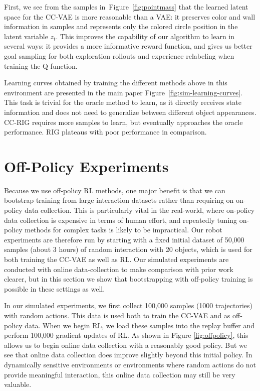 First, we see from the samples in~Figure~\ref{fig:pointmass} that the learned latent space for the CC-VAE is more reasonable than a VAE: it preserves color and wall information in samples and represents only the colored circle position in the latent variable $z_t$. This improves the capability of our algorithm to learn in several ways: it provides a more informative reward function, and gives us better goal sampling for both exploration rollouts and experience relabeling when training the Q function.

Learning curves obtained by training the different methods above in this environment are presented in the main paper Figure~\ref{fig:sim-learning-curves}. This task is trivial for the oracle method to learn, as it directly receives state information and does not need to generalize between different object appearances. CC-RIG requires more samples to learn, but eventually approaches the oracle performance. RIG plateaus with poor performance in comparison.

\pagebreak

\section{Off-Policy Experiments}

Because we use off-policy RL methods, one major benefit is that we can bootstrap training from large interaction datasets rather than requiring on on-policy data collection. This is particularly vital in the real-world, where on-policy data collection is expensive in terms of human effort, and repeatedly tuning on-policy methods for complex tasks is likely to be impractical. Our robot experiments are therefore run by starting with a fixed initial dataset of 50,000 samples (about 3 hours) of random interaction with 20 objects, which is used for both training the CC-VAE as well as RL. Our simulated experiments are conducted with online data-collection to make comparison with prior work clearer, but in this section we show that bootstrapping with off-policy training is possible in these settings as well.

In our simulated experiments, we first collect 100,000 samples (1000 trajectories) with random actions. This data is used both to train the CC-VAE and as off-policy data. When we begin RL, we load these samples into the replay buffer and perform 100,000 gradient updates of RL. As shown in Figure \ref{fig:offpolicy}, this allows us to begin online data collection with a reasonably good policy. But we see that online data collection does improve slightly beyond this initial policy. In dynamically sensitive environments or environments where random actions do not provide meaningful interaction, this online data collection may still be very valuable.

